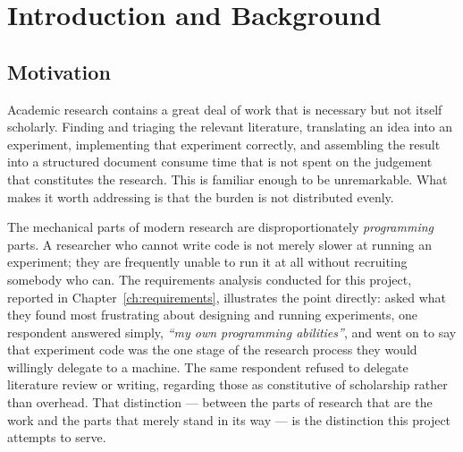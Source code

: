 \chapter{Introduction and Background}
\label{ch:intro}


\section{Motivation}
\label{sec:motivation}

Academic research contains a great deal of work that is necessary but not itself scholarly.
Finding and triaging the relevant literature, translating an idea into an experiment,
implementing that experiment correctly, and assembling the result into a structured document
consume time that is not spent on the judgement that constitutes the research. This is
familiar enough to be unremarkable. What makes it worth addressing is that the burden is not
distributed evenly.

The mechanical parts of modern research are disproportionately \emph{programming} parts. A
researcher who cannot write code is not merely slower at running an experiment; they are
frequently unable to run it at all without recruiting somebody who can. The requirements
analysis conducted for this project, reported in Chapter~\ref{ch:requirements}, illustrates
the point directly: asked what they found most frustrating about designing and running
experiments, one respondent answered simply, \emph{``my own programming abilities''}, and went
on to say that experiment code was the one stage of the research process they would willingly
delegate to a machine. The same respondent refused to delegate literature review or writing,
regarding those as constitutive of scholarship rather than overhead. That distinction ---
between the parts of research that are the work and the parts that merely stand in its way ---
is the distinction this project attempts to serve.

